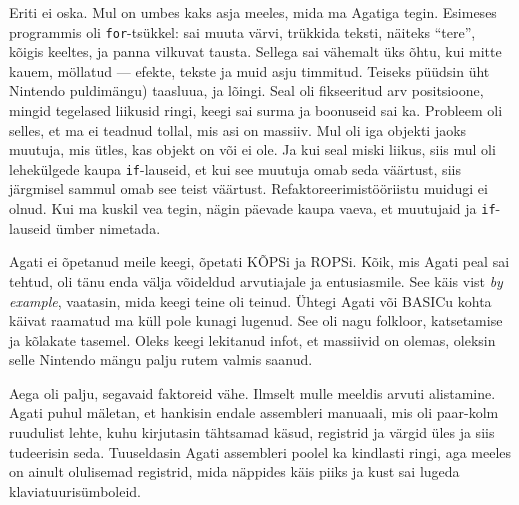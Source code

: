 Eriti ei oska. Mul on umbes kaks asja meeles, mida ma Agatiga tegin. Esimeses 
programmis oli \verb|for|-tsükkel: sai muuta värvi, trükkida 
teksti, näiteks \enquote{tere}, kõigis keeltes, ja panna vilkuvat 
tausta. Sellega sai vähemalt üks õhtu, kui mitte kauem, möllatud ---
efekte, tekste ja muid asju timmitud. Teiseks püüdsin 
üht Nintendo puldimängu) taasluua, ja 
lõingi. Seal oli fikseeritud arv positsioone, mingid tegelased 
liikusid ringi, keegi sai surma ja 
boonuseid sai ka. Probleem oli selles, et ma ei teadnud tollal, mis asi 
on massiiv. Mul oli iga objekti jaoks muutuja, 
mis ütles, kas objekt on või ei ole. Ja kui seal miski liikus, siis 
mul oli lehekülgede kaupa \verb|if|-lauseid, et kui see muutuja omab seda 
väärtust, siis järgmisel sammul omab see teist väärtust. 
Refaktoreerimistööriistu muidugi ei olnud. Kui ma kuskil vea tegin, nägin 
päevade kaupa vaeva, et muutujaid ja \verb|if|-lauseid 
ümber nimetada.



Agati ei õpetanud meile keegi, õpetati 
KÕPSi ja ROPSi. Kõik, mis Agati peal sai tehtud, oli tänu enda välja 
võideldud arvutiajale ja entusiasmile. See käis vist \emph{by 
example}, vaatasin, mida keegi teine oli teinud. Ühtegi Agati või BASICu kohta 
käivat raamatud ma küll pole kunagi lugenud. See oli nagu folkloor, 
katsetamise ja kõlakate tasemel. Oleks keegi lekitanud infot, et 
massiivid on olemas, oleksin selle Nintendo mängu palju rutem valmis saanud. 


Aega oli palju, segavaid faktoreid vähe. Ilmselt mulle meeldis
arvuti alistamine. Agati puhul
mäletan, et hankisin endale 
assembleri manuaali, mis oli 
paar-kolm ruudulist lehte, kuhu kirjutasin tähtsamad käsud, registrid 
ja värgid üles ja siis tudeerisin seda. 
Tuuseldasin Agati assembleri poolel ka kindlasti ringi, aga meeles on ainult olulisemad registrid, mida näppides käis piiks 
ja kust sai lugeda klaviatuurisümboleid.

